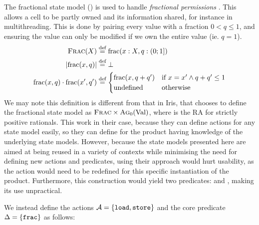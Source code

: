 The fractional state model \Frac(\Val) is used to handle \emph{fractional permissions} \cite{fracpermissions,fracpermissions2}. This allows a cell to be partly owned and its information shared, for instance in multithreading. This is done by pairing every value with a fraction $0<q\leq 1$, and ensuring the value can only be modified if we own the entire value (ie. $q=1$). \begin{align*}
	\textsc{Frac}(X)&\stackrel{\textnormal{def}}= \text{frac}(x: X, q: (0;1])\\
	|\text{frac}(x, q)| &\stackrel{\textnormal{def}}= \bot\\
	\text{frac}(x,q)\cdot\text{frac}(x',q')&\stackrel{\textnormal{def}}= \begin{cases}
		\text{frac}(x,q+q') & \text{if}~ x=x' \land q+q' \leq 1\\
		\text{undefined} &\text{otherwise}
	\end{cases}
\end{align*}
We may note this definition is different from that in Iris, that chooses to define the fractional state model as $\textsc{Frac} \times \textsc{Ag}_0(\text{Val})$, where \Frac{} is the RA for strictly positive rationals. This work in their case, because they can define actions for any state model easily, so they can define \load{} for the product having knowledge of the underlying state models. However, because the state models presented here are aimed at being reused in a variety of contexts while minimising the need for defining new actions and predicates, using their approach would hurt usability, as the \load{} action would need to be redefined for this specific instantiation of the product. Furthermore, this construction would yield two predicates: \agP{} and \fracP{}, making its use unpractical.

We instead define the actions ${\cal{A}}=\{\texttt{load},\texttt{store}\}$ and the core predicate $\Delta=\{\texttt{frac}\}$ as follows:

